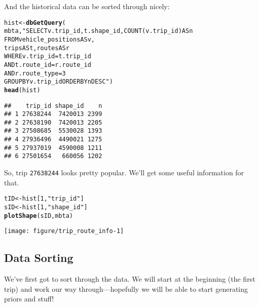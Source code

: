 \documentclass[11pt]{article}\usepackage[]{graphicx}\usepackage[]{color}
\makeatletter
\def\maxwidth{ %
  \ifdim\Gin@nat@width>\linewidth
    \linewidth
  \else
    \Gin@nat@width
  \fi
}
\newcommand{\hlnum}[1]{\textcolor[rgb]{0.686,0.059,0.569}{#1}}%
\newcommand{\hlstr}[1]{\textcolor[rgb]{0.192,0.494,0.8}{#1}}%
\newcommand{\hlstd}[1]{\textcolor[rgb]{0.345,0.345,0.345}{#1}}%
\newcommand{\hlkwb}[1]{\textcolor[rgb]{0.69,0.353,0.396}{#1}}%
\newcommand{\hlkwd}[1]{\textcolor[rgb]{0.737,0.353,0.396}{\textbf{#1}}}%
\newenvironment{kframe}{%
 \def\at@end@of@kframe{}%
 \ifinner\ifhmode%
  \def\at@end@of@kframe{\end{minipage}}%
  \begin{minipage}{\columnwidth}%
 \fi\fi%
 \def\FrameCommand##1{\hskip\@totalleftmargin \hskip-\fboxsep
 \colorbox{shadecolor}{##1}\hskip-\fboxsep
     \hskip-\linewidth \hskip-\@totalleftmargin \hskip\columnwidth}%
 \MakeFramed {\advance\hsize-\width
   \@totalleftmargin\z@ \linewidth\hsize
   \@setminipage}}%
 {\par\unskip\endMakeFramed%
 \at@end@of@kframe}
\newenvironment{knitrout}{}{} %
\makeatother
\begin{document}
And the historical data can be sorted through nicely:
\begin{knitrout}
\color{fgcolor}\begin{kframe}
\begin{alltt}
\hlstd{hist} \hlkwb{<-} \hlkwd{dbGetQuery}\hlstd{(}
    \hlstd{mbta,} \hlstr{"SELECT v.trip_id, t.shape_id, COUNT(v.trip_id) AS n
           FROM vehicle_positions AS v, 
                trips AS t, routes AS r
           WHERE v.trip_id=t.trip_id
             AND t.route_id=r.route_id
             AND r.route_type=3
           GROUP BY v.trip_id ORDER BY n DESC"}\hlstd{)}
\hlkwd{head}\hlstd{(hist)}
\end{alltt}
\begin{verbatim}
##    trip_id shape_id    n
## 1 27638244  7420013 2399
## 2 27638190  7420013 2205
## 3 27508685  5530028 1393
## 4 27936496  4490021 1275
## 5 27937019  4590008 1211
## 6 27501654   660056 1202
\end{verbatim}
\end{kframe}
\end{knitrout}

So, trip \verb+27638244+ looks pretty popular. We'll get some useful information for that.
\begin{knitrout}
\color{fgcolor}\begin{kframe}
\begin{alltt}
\hlstd{tID} \hlkwb{<-} \hlstd{hist[}\hlnum{1}\hlstd{,} \hlstr{"trip_id"}\hlstd{]}
\hlstd{sID} \hlkwb{<-} \hlstd{hist[}\hlnum{1}\hlstd{,} \hlstr{"shape_id"}\hlstd{]}
\hlkwd{plotShape}\hlstd{(sID, mbta)}
\end{alltt}
\end{kframe}

{\centering \texttt{[image: figure/trip\_route\_info-1]} 

}



\end{knitrout}


\subsection{Data Sorting}

We've first got to sort through the data. We will start at the beginning (the first trip) and work
our way through---hopefully we will be able to start generating priors and stuff!
\end{document}

